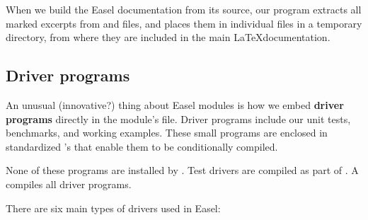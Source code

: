 When we build the Easel documentation from its source, our
 program extracts all marked excerpts from 
and  files, and places them in individual files in a
temporary  directory, from where they are included
in the main \LaTeX documentation.



\subsection{Driver programs}

An unusual (innovative?) thing about Easel modules is how we embed
{\bfseries driver programs} directly in the module's 
file. Driver programs include our unit tests, benchmarks, and working
examples. These small programs are enclosed in standardized
's that enable them to be conditionally compiled.

None of these programs are installed by .  Test
drivers are compiled as part of .  A  compiles all driver programs.

There are six main types of drivers used in Easel:

